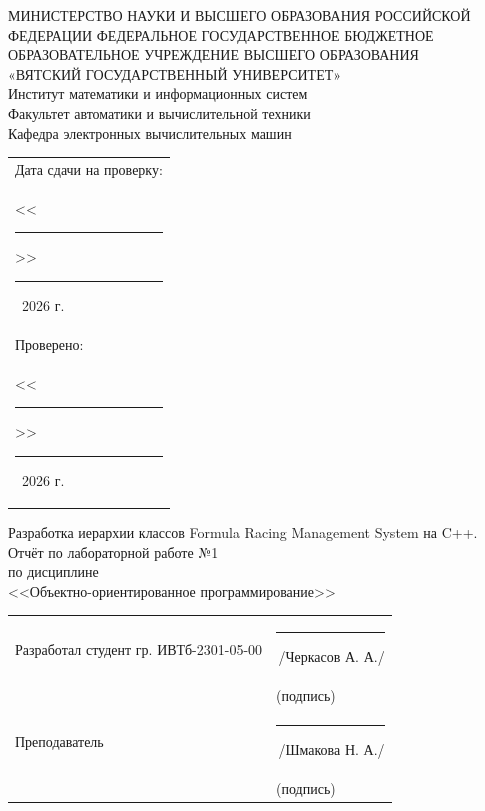 \documentclass[oneside,a4paper,14pt]{extarticle}
\begin{document}
\newpage
\thispagestyle{empty}
\begin{center}
  МИНИСТЕРСТВО НАУКИ И ВЫСШЕГО ОБРАЗОВАНИЯ РОССИЙСКОЙ ФЕДЕРАЦИИ ФЕДЕРАЛЬНОЕ ГОСУДАРСТВЕННОЕ БЮДЖЕТНОЕ ОБРАЗОВАТЕЛЬНОЕ УЧРЕЖДЕНИЕ ВЫСШЕГО ОБРАЗОВАНИЯ\\
  «ВЯТСКИЙ ГОСУДАРСТВЕННЫЙ УНИВЕРСИТЕТ»\\
  Институт математики и информационных систем\\
  Факультет автоматики и вычислительной техники\\
  Кафедра электронных вычислительных машин
\end{center}
\vspace{10mm}

\hfill
\begin{tabular}{l}
  \footnotesize Дата сдачи на проверку:                                          \\
  \footnotesize <<\rule[-1mm]{5mm}{0.10mm}\/>>\rule[-1mm]{20mm}{0.10mm}\ 2026 г. \\
  \footnotesize Проверено:                                                       \\
  \footnotesize <<\rule[-1mm]{5mm}{0.10mm}\/>>\rule[-1mm]{20mm}{0.10mm}\ 2026 г. \\
\end{tabular}
\vfill

\begin{center}
  Разработка иерархии классов Formula Racing Management System на C++. \\
  Отчёт по лабораторной работе №1\\
  по дисциплине\\
  <<Объектно-ориентированное программирование>>\\
\end{center}
\vspace{25mm}
\noindent
\begin{tabular}{ll}
  Разработал студент гр. ИВТб-2301-05-00 & \hspace{18mm}\rule[-1mm]{30mm}{0.10mm}\,/Черкасов А. А./ \\
                                         & \hspace{25.5mm}\footnotesize(подпись)                    \\
  Преподаватель                  & \hspace{18mm}\rule[-1mm]{30mm}{0.10mm}\,/Шмакова Н. А./   \\
                                         & \hspace{25.5mm}\footnotesize(подпись)                    \\
\end{tabular}
\end{document}
